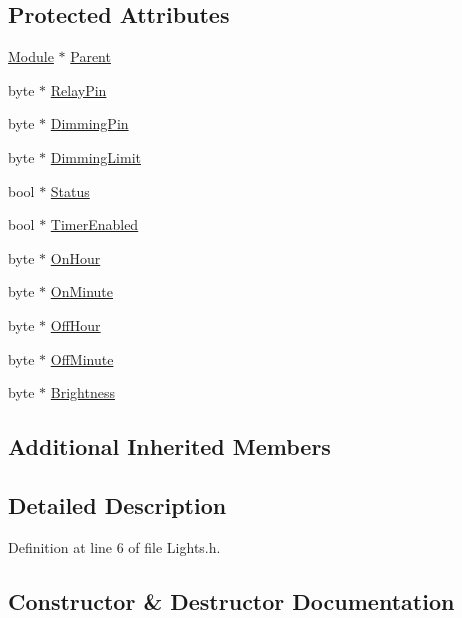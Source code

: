 \subsection*{Protected Attributes}
\begin{DoxyCompactItemize}
\item 
\hyperlink{class_module}{Module} $\ast$ \hyperlink{class_lights_aae73ad0f2de1a24e5c12add1d302e367}{Parent}
\item 
byte $\ast$ \hyperlink{class_lights_adb3fe393e7ccae4ac7b3509b2ab2b2a2}{Relay\+Pin}
\item 
byte $\ast$ \hyperlink{class_lights_aab83439bd6f6cc12e16297b3feddcb2b}{Dimming\+Pin}
\item 
byte $\ast$ \hyperlink{class_lights_a21c6f9644f993681a07d09fccada5477}{Dimming\+Limit}
\item 
bool $\ast$ \hyperlink{class_lights_a5f5ca6f90f96be38cbaa00cc6302eebd}{Status}
\item 
bool $\ast$ \hyperlink{class_lights_a2b2938ba677b462b6a464c325b085945}{Timer\+Enabled}
\item 
byte $\ast$ \hyperlink{class_lights_a40dc32d057dbf4c0e7e840fce2ac3a2d}{On\+Hour}
\item 
byte $\ast$ \hyperlink{class_lights_ac94ddb9da64af75953b178fb852ef936}{On\+Minute}
\item 
byte $\ast$ \hyperlink{class_lights_a0848dbae7fe968b7ade25ed517178968}{Off\+Hour}
\item 
byte $\ast$ \hyperlink{class_lights_ad9d9a09fbfeb6843116a0d77f1e947dd}{Off\+Minute}
\item 
byte $\ast$ \hyperlink{class_lights_ac5fa7d7fdfb9a051a63dde55b67925fe}{Brightness}
\end{DoxyCompactItemize}
\subsection*{Additional Inherited Members}


\subsection{Detailed Description}


Definition at line 6 of file Lights.\+h.



\subsection{Constructor \& Destructor Documentation}
\mbox{\label{class_lights_a48acde7f45e4b9b22969e52fea689040}} 
